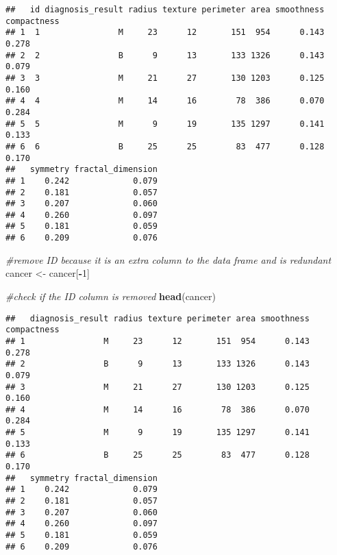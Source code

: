 \documentclass[]{article}
\newenvironment{Shaded}{\begin{snugshade}}{\end{snugshade}}
\newcommand{\KeywordTok}[1]{\textcolor[rgb]{0.13,0.29,0.53}{\textbf{#1}}}
\newcommand{\DecValTok}[1]{\textcolor[rgb]{0.00,0.00,0.81}{#1}}
\newcommand{\StringTok}[1]{\textcolor[rgb]{0.31,0.60,0.02}{#1}}
\newcommand{\CommentTok}[1]{\textcolor[rgb]{0.56,0.35,0.01}{\textit{#1}}}
\newcommand{\OperatorTok}[1]{\textcolor[rgb]{0.81,0.36,0.00}{\textbf{#1}}}
\newcommand{\NormalTok}[1]{#1}
\begin{document}
\begin{verbatim}
##   id diagnosis_result radius texture perimeter area smoothness compactness
## 1  1                M     23      12       151  954      0.143       0.278
## 2  2                B      9      13       133 1326      0.143       0.079
## 3  3                M     21      27       130 1203      0.125       0.160
## 4  4                M     14      16        78  386      0.070       0.284
## 5  5                M      9      19       135 1297      0.141       0.133
## 6  6                B     25      25        83  477      0.128       0.170
##   symmetry fractal_dimension
## 1    0.242             0.079
## 2    0.181             0.057
## 3    0.207             0.060
## 4    0.260             0.097
## 5    0.181             0.059
## 6    0.209             0.076
\end{verbatim}

\begin{Shaded}
\begin{Highlighting}[]
\CommentTok{#remove ID because it is an extra column to the data frame and is redundant}
\NormalTok{cancer <-}\StringTok{ }\NormalTok{cancer[}\OperatorTok{-}\DecValTok{1}\NormalTok{]}

\CommentTok{#check if the ID column is removed}
\KeywordTok{head}\NormalTok{(cancer)}
\end{Highlighting}
\end{Shaded}

\begin{verbatim}
##   diagnosis_result radius texture perimeter area smoothness compactness
## 1                M     23      12       151  954      0.143       0.278
## 2                B      9      13       133 1326      0.143       0.079
## 3                M     21      27       130 1203      0.125       0.160
## 4                M     14      16        78  386      0.070       0.284
## 5                M      9      19       135 1297      0.141       0.133
## 6                B     25      25        83  477      0.128       0.170
##   symmetry fractal_dimension
## 1    0.242             0.079
## 2    0.181             0.057
## 3    0.207             0.060
## 4    0.260             0.097
## 5    0.181             0.059
## 6    0.209             0.076
\end{verbatim}

\begin{Shaded}
\end{Shaded}
\end{document}
